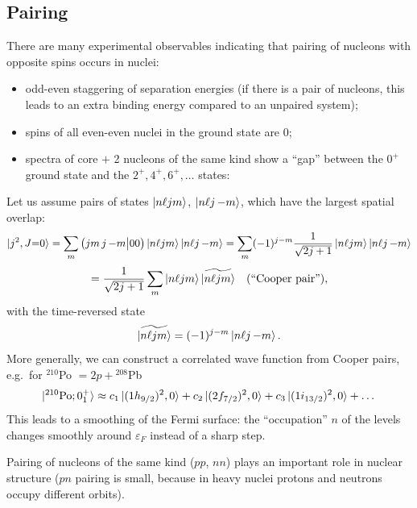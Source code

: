 \documentclass[11pt,a4paper]{article}
\begin{document}
\subsection{Pairing}
There are many experimental observables indicating that pairing of nucleons with opposite spins occurs in nuclei:
\begin{itemize}
\item odd-even staggering of separation energies (if there is a pair of nucleons, this leads to an extra binding energy compared to an unpaired system);
\item spins of all even-even nuclei in the ground state are 0;
\item spectra of core $+$ 2 nucleons of the same kind show a ``gap'' between the $0^+$ ground state and the $2^+,4^+,6^+,\dots$ states:
\end{itemize}
\begin{center}
\end{center}
Let us assume pairs of states $\ket{n\ell jm}$, $\ket{n\ell j\,{-m}}$, which have the largest spatial overlap:
\[
\ket{j^2,J{=}0}=\sum_m\big(jm\,j\,{-m}\big|00\big)\ket{n\ell jm}\ket{n\ell j\,{-m}}
=\sum_m(-1)^{j-m}\frac{1}{\sqrt{2j+1}}\ket{n\ell jm}\ket{n\ell j\,{-m}}
\]
\[
=\frac{1}{\sqrt{2j+1}}\sum_m\ket{n\ell jm}\widetilde{\ket{n\ell jm}}\quad\text{(``Cooper pair'')},
\]
with the time-reversed state
\[
\widetilde{\ket{n\ell jm}}=(-1)^{j-m}\ket{n\ell j\,{-m}} .
\]
More generally, we can construct a correlated wave function from Cooper pairs, e.g.\ for ${}^{210}$Po $=2p+{}^{208}$Pb
\[
\ket{{}^{210}\text{Po};0^+_1}\approx c_1\ket{(1h_{9/2})^2,0}+c_2\ket{(2f_{7/2})^2,0}+c_3\ket{(1i_{13/2})^2,0}+\dots
\]
This leads to a smoothing of the Fermi surface: the ``occupation'' $n$ of the levels changes smoothly around $\varepsilon_F$ instead of a sharp step.
\begin{center}
\end{center}
Pairing of nucleons of the same kind ($pp$, $nn$) plays an important role in nuclear structure ($pn$ pairing is small, because in heavy nuclei protons and neutrons occupy different orbits).
\end{document}

